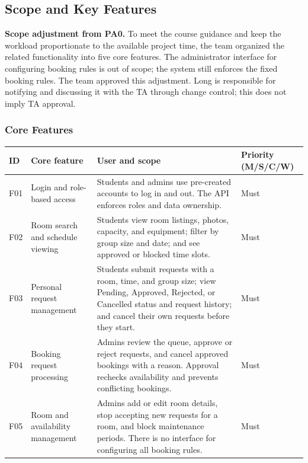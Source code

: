 \subsection{Scope and Key Features}

\textbf{Scope adjustment from PA0.} To meet the course guidance and keep the
workload proportionate to the available project time, the team organized the
related functionality into five core features. The administrator interface for
configuring booking rules is out of scope; the system still enforces the fixed
booking rules. The team approved this adjustment. Long is responsible for
notifying and discussing it with the TA through change control; this does not
imply TA approval.

\subsubsection{Core Features}
\begin{tabularx}{\textwidth}{@{}L{0.08\textwidth}L{0.20\textwidth}Y L{0.17\textwidth}@{}}
\toprule
ID & Core feature & User and scope & Priority (M/S/C/W) \\
\midrule
F01 & Login and role-based access & Students and admins use pre-created accounts to log in and out. The API enforces roles and data ownership. & Must \\
F02 & Room search and schedule viewing & Students view room listings, photos, capacity, and equipment; filter by group size and date; and see approved or blocked time slots. & Must \\
F03 & Personal request management & Students submit requests with a room, time, and group size; view Pending, Approved, Rejected, or Cancelled status and request history; and cancel their own requests before they start. & Must \\
F04 & Booking request processing & Admins review the queue, approve or reject requests, and cancel approved bookings with a reason. Approval rechecks availability and prevents conflicting bookings. & Must \\
F05 & Room and availability management & Admins add or edit room details, stop accepting new requests for a room, and block maintenance periods. There is no interface for configuring all booking rules. & Must \\
\bottomrule
\end{tabularx}

